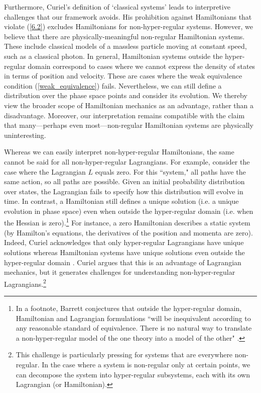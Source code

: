 \documentclass[letterpaper]{article}
\begin{document}
Furthermore, Curiel's definition of `classical systems' leads to interpretive challenges that our framework avoids. His prohibition against Hamiltonians that violate (\ref{6.2}) excludes Hamiltonians for non-hyper-regular systems. However, we believe that there are physically-meaningful non-regular Hamiltonian systems. These include classical models of a massless particle moving at constant speed, such as a classical photon. In general, Hamiltonian systems outside the hyper-regular domain correspond to cases where we cannot express the density of states in terms of position and velocity. These are cases where the weak equivalence condition (\ref{weak_equivalence}) fails. Nevertheless, we can still define a distribution over the phase space points and consider its evolution. We thereby view the broader scope of Hamiltonian mechanics as an advantage, rather than a disadvantage. Moreover, our interpretation remains compatible with the claim that many---perhaps even most---non-regular Hamiltonian systems are physically uninteresting.

Whereas we can easily interpret non-hyper-regular Hamiltonians, the same cannot be said for all non-hyper-regular Lagrangians. For example, consider the case where the Lagrangian $L$ equals zero. For this ``system," all paths have the same action, so all paths are possible. Given an initial probability distribution over states, the Lagrangian fails to specify how this distribution will evolve in time. In contrast, a Hamiltonian still defines a unique solution (i.e. a unique evolution in phase space) even when outside the hyper-regular domain (i.e. when the Hessian is zero).\footnote{In a footnote, Barrett conjectures that outside the hyper-regular domain, Hamiltonian and Lagrangian formulations ``will be inequivalent according to any reasonable standard of equivalence. There is no natural way to translate a non-hyper-regular model of the one theory into a model of the other" \parencites*[1179]{Barrett2}.} For instance, a zero Hamiltonian describes a static system (by Hamilton's equations, the derivatives of the position and momenta are zero). Indeed, Curiel acknowledges that only hyper-regular Lagrangians have unique solutions whereas Hamiltonian systems have unique solutions even outside the hyper-regular domain \parencites*[291, 308]{Curiel}. Curiel argues that this is an advantage of Lagrangian mechanics, but it generates challenges for understanding non-hyper-regular Lagrangians.\footnote{This challenge is particularly pressing for systems that are everywhere non-regular. In the case where a system is non-regular only at certain points, we can decompose the system into hyper-regular subsystems, each with its own Lagrangian (or Hamiltonian).}
\end{document}
